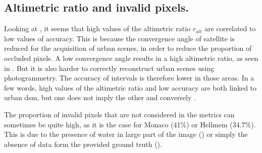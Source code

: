 \subsection{Altimetric ratio and invalid pixels.}
Looking at , it seems that high values of the altimetric ratio $r_{alt}$ are correlated to low values of accuracy. This is because the convergence angle of satellite is reduced for the acquisition of urban scenes, in order to reduce the proportion of occluded pixels. A low convergence angle results in a high altimetric ratio, as seen in . But it is also harder to correctly reconstruct urban scenes using photogrammetry. The accuracy of intervals is therefore lower in those areas. In a few words, high values of the altimetric ratio and low accuracy are both linked to urban \acrshort{dsm}, but one does not imply the other and conversely .

The proportion of invalid pixels that are not considered in the metrics can sometimes be quite high, as it is the case for Monaco (41$\%$) or Hellmem (34.7$\%$). This is due to the presence of water in large part of the image () or simply the absence of data form the provided ground truth ().



